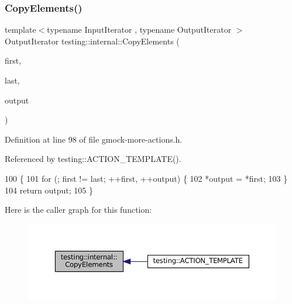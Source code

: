 \subsubsection{\texorpdfstring{Copy\+Elements()}{CopyElements()}}
{\footnotesize\ttfamily template$<$typename Input\+Iterator , typename Output\+Iterator $>$ \\
Output\+Iterator testing\+::internal\+::\+Copy\+Elements (\begin{DoxyParamCaption}\item[{Input\+Iterator}]{first,  }\item[{Input\+Iterator}]{last,  }\item[{Output\+Iterator}]{output }\end{DoxyParamCaption})\hspace{0.3cm}{\ttfamily [inline]}}



Definition at line 98 of file gmock-\/more-\/actions.\+h.



Referenced by testing\+::\+A\+C\+T\+I\+O\+N\+\_\+\+T\+E\+M\+P\+L\+A\+T\+E().


\begin{DoxyCode}
100                                                           \{
101   \textcolor{keywordflow}{for} (; first != last; ++first, ++output) \{
102     *output = *first;
103   \}
104   \textcolor{keywordflow}{return} output;
105 \}
\end{DoxyCode}
Here is the caller graph for this function\+:
\nopagebreak
\begin{figure}[H]
\begin{center}
\leavevmode
\includegraphics[width=350pt]{namespacetesting_1_1internal_a9372c12747bcf964aacb1284f8048cae_icgraph}
\end{center}
\end{figure}
\mbox{\label{namespacetesting_1_1internal_a1e77a774d910346eff11a86d8df783a5}} 
